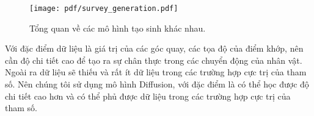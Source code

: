 
\begin{figure}[t]
	\centering
	\texttt{[image: pdf/survey\_generation.pdf]}
	\caption{
		Tổng quan về các mô hình tạo sinh khác nhau.
	}
	\vspace{-3mm}
	\label{fig:generative-models}
\end{figure}

Với đặc điểm dữ liệu là giá trị của các góc quay, các tọa độ của điểm khớp, nên cần độ chi tiết cao để tạo ra sự chân thực trong các chuyển động của nhân vật. Ngoài ra dữ liệu sẽ thiếu và rất ít dữ liệu trong các trường hợp cực trị của tham số.
Nên chúng tôi sử dụng mô hình Diffusion, với đặc điểm là có thể học được độ chi tiết cao hơn và có thể phủ được dữ liệu trong các trường hợp cực trị của tham số.

%
%


